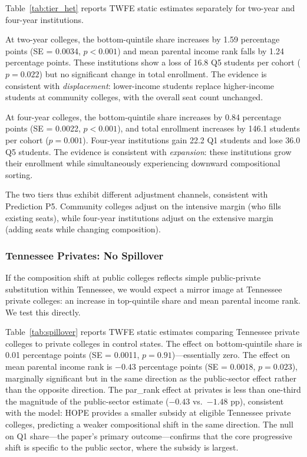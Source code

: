 Table~\ref{tab:tier_het} reports TWFE static estimates separately for
two-year and four-year institutions.

At two-year colleges, the bottom-quintile share increases by 1.59
percentage points (SE = 0.0034, $p < 0.001$) and mean parental income
rank falls by 1.24 percentage points. These institutions show a loss of
16.8 Q5 students per cohort ($p = 0.022$) but no significant change in
total enrollment. The evidence is consistent with \emph{displacement}:
lower-income students replace higher-income students at community
colleges, with the overall seat count unchanged.

At four-year colleges, the bottom-quintile share increases by 0.84
percentage points (SE = 0.0022, $p < 0.001$), and total enrollment
increases by 146.1 students per cohort ($p = 0.001$). Four-year
institutions gain 22.2 Q1 students and lose 36.0 Q5 students. The
evidence is consistent with \emph{expansion}: these institutions grow
their enrollment while simultaneously experiencing downward
compositional sorting.

The two tiers thus exhibit different adjustment channels, consistent
with Prediction P5. Community colleges adjust on the intensive margin
(who fills existing seats), while four-year institutions adjust on
the extensive margin (adding seats while changing composition).

\subsubsection{Tennessee Privates: No Spillover}

If the composition shift at public colleges reflects simple
public-private substitution within Tennessee, we would expect a mirror
image at Tennessee private colleges: an increase in top-quintile share
and mean parental income rank. We test this directly.

Table~\ref{tab:spillover} reports TWFE static estimates comparing
Tennessee private colleges to private colleges in control states. The
effect on
bottom-quintile share is 0.01 percentage points (SE = 0.0011,
$p = 0.91$)---essentially zero. The effect on mean parental income rank
is $-0.43$ percentage points (SE = 0.0018, $p = 0.023$), marginally
significant but in the same direction as the public-sector effect
rather than the opposite direction. The par\_rank effect at privates is
less than one-third the magnitude of the public-sector estimate
($-0.43$ vs.\ $-1.48$ pp), consistent with the model: HOPE provides a
smaller subsidy at eligible Tennessee private colleges, predicting a
weaker compositional shift in the same direction. The null on Q1
share---the paper's primary outcome---confirms that the core
progressive shift is specific to the public sector, where the subsidy
is largest.

